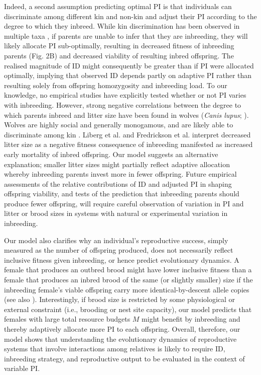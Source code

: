 \documentclass[12pt]{article}
\begin{document}
Indeed, a second assumption predicting optimal PI is that individuals can discriminate among different kin and non-kin and adjust their PI according to the degree to which they inbreed. While kin discrimination has been observed in multiple taxa \cite[e.g.,][]{Mateo2002, Griffin2003, Dudley2007, Strassmann2011}, if parents are unable to infer that they are inbreeding, they will likely allocate PI sub-optimally, resulting in decreased fitness of inbreeding parents (Fig. 2B) and decreased viability of resulting inbred offspring. The realised magnitude of ID might consequently be greater than if PI were allocated optimally, implying that observed ID depends partly on adaptive PI rather than resulting solely from offspring homozygosity and inbreeding load. To our knowledge, no empirical studies have explicitly tested whether or not PI varies with inbreeding. However, strong negative correlations between the degree to which parents inbreed and litter size have been found in wolves (\textit{Canis lupus}; \cite{Liberg2005, Fredrickson2007}). Wolves are highly social and generally monogamous, and are likely able to discriminate among kin \cite[][]{Raikkonen2009, Geffen2011}. Liberg et al. \cite{Liberg2005} and Fredrickson et al. \cite{Fredrickson2007} interpret decreased litter size as a negative fitness consequence of inbreeding manifested as increased early mortality of inbred offspring. Our model suggests an alternative explanation; smaller litter sizes might partially reflect adaptive allocation whereby inbreeding parents invest more in fewer offspring. Future empirical assessments of the relative contributions of ID and adjusted PI in shaping offspring viability, and tests of the prediction that inbreeding parents should produce fewer offspring, will require careful observation of variation in PI and litter or brood sizes in systems with natural or experimental variation in inbreeding.

Our model also clarifies why an individual's reproductive success, simply measured as the number of offspring produced, does not necessarily reflect inclusive fitness given inbreeding, or hence predict evolutionary dynamics. A female that produces an outbred brood might have lower inclusive fitness than a female that produces an inbred brood of the same (or slightly smaller) size if the inbreeding female's viable offspring carry more identical-by-descent allele copies (see also \cite{Reid2016}). Interestingly, if brood size is restricted by some physiological or external constraint (i.e., brooding or nest site capacity), our model predicts that females with large total resource budgets $M$ might benefit by inbreeding and thereby adaptively allocate more PI to each offspring. Overall, therefore, our model shows that understanding the evolutionary dynamics of reproductive systems that involve interactions among relatives is likely to require ID, inbreeding strategy, and reproductive output to be evaluated in the context of variable PI.
\end{document}
